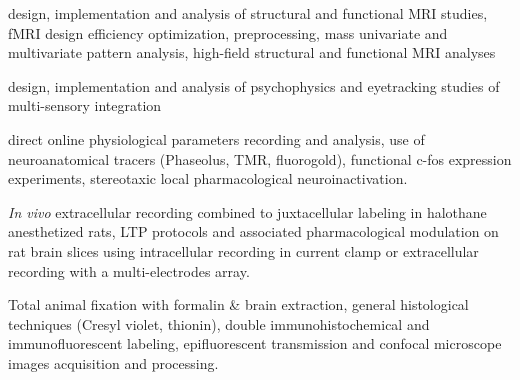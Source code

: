  design, implementation and analysis of structural
and functional MRI studies, fMRI design efficiency optimization, preprocessing,
mass univariate and multivariate pattern analysis,
high-field structural and functional MRI analyses

 design, implementation and analysis of psychophysics
and eyetracking studies of multi-sensory integration

 direct online physiological parameters recording and analysis,
use of neuroanatomical tracers (Phaseolus, TMR, fluorogold), functional c-fos expression experiments,
stereotaxic local pharmacological neuroinactivation.

 \textit{In vivo} extracellular recording combined
to juxtacellular labeling in halothane anesthetized rats, LTP protocols
and associated pharmacological modulation on rat brain slices using intracellular recording
in current clamp or extracellular recording with a multi-electrodes array.

 Total animal fixation with formalin \& brain extraction,
general histological techniques (Cresyl violet, thionin), double immunohistochemical and
immunofluorescent labeling, epifluorescent transmission
and confocal microscope images acquisition and processing.
